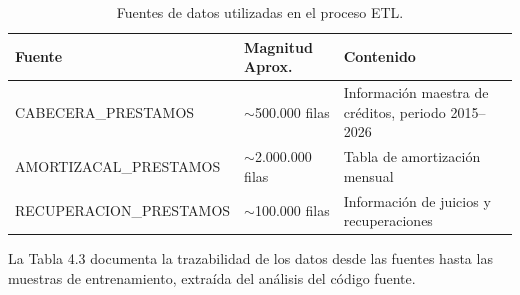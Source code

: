 \begin{table}[H]
    \centering
    \begin{tabular}{        
        | >{\raggedright\arraybackslash}p{6.5cm}
        | >{\raggedright\arraybackslash}p{3.5cm}        
        | >{\raggedright\arraybackslash}p{4.5cm} |   
    }
    \hline
        \textbf{Fuente} & \textbf{Magnitud Aprox.} & \textbf{Contenido} \\
    \hline
        CABECERA\_PRESTAMOS & $\sim$500.000 filas & Información maestra de créditos, periodo 2015--2026 \\
    \hline
        AMORTIZACAL\_PRESTAMOS & $\sim$2.000.000 filas & Tabla de amortización mensual \\
    \hline
        RECUPERACION\_PRESTAMOS & $\sim$100.000 filas & Información de juicios y recuperaciones \\
    \hline
    \end{tabular}
    \caption{Fuentes de datos utilizadas en el proceso ETL.}
    \label{tab:fuentes_datos}
\end{table}

La Tabla 4.3 documenta la trazabilidad de los datos desde las fuentes hasta las muestras de entrenamiento, extraída del análisis del código fuente.

